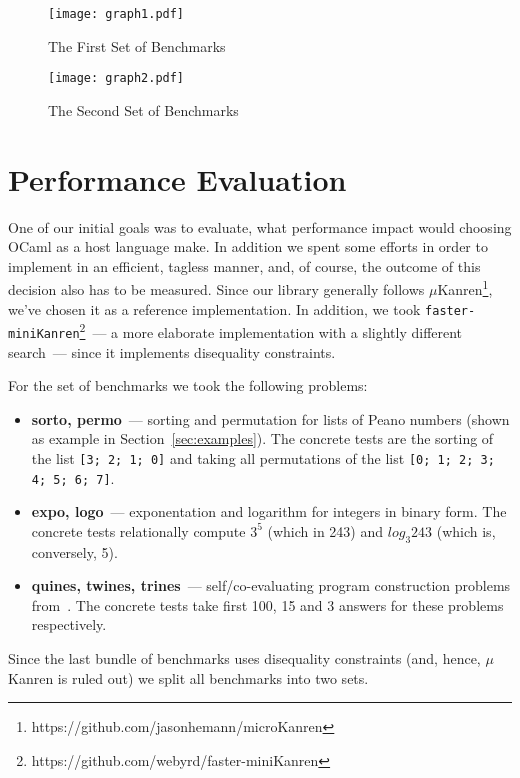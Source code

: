 \begin{figure}[t]
\centering
\texttt{[image: graph1.pdf]}
\caption{The First Set of Benchmarks}
\label{eval:first}
\end{figure}
\begin{figure}[t]
\centering
\texttt{[image: graph2.pdf]}
\caption{The Second Set of Benchmarks}
\label{eval:second}
\end{figure}

\section{Performance Evaluation}
\label{sec:evaluation}

One of our initial goals was to evaluate, what performance impact would choosing
OCaml as a host language make. In addition we spent some efforts in order to implement \miniKanren in
an efficient, tagless manner, and, of course, the outcome of this decision also has to be measured.
Since our library generally follows $\mu$Kanren\footnote{https://github.com/jasonhemann/microKanren}, we've chosen it as a reference implementation.
In addition, we took \texttt{faster-miniKanren}\footnote{https://github.com/webyrd/faster-miniKanren}~--- a more elaborate
implementation with a slightly different search~--- since it implements disequality constraints.

For the set of benchmarks we took the following problems:

\begin{itemize}
\item \textbf{sorto, permo}~--- sorting and permutation for lists of Peano numbers (shown as example in Section~\ref{sec:examples}).
The concrete tests are the sorting of the list \lstinline{[3; 2; 1; 0]} and taking all permutations of the list \lstinline{[0; 1; 2; 3; 4; 5; 6; 7]}.
\item \textbf{expo, logo}~--- exponentation and logarithm for integers in binary form. The concrete tests relationally compute
$3^5$ (which in 243) and $log_3 243$ (which is, conversely, 5).
\item \textbf{quines, twines, trines}~--- self/co-evaluating program construction problems from~\cite{Untagged}. The
concrete tests take first 100, 15 and 3 answers for these problems respectively.
\end{itemize}

Since the last bundle of benchmarks uses disequality constraints (and, hence, $\mu$Kanren is ruled out) we
split all benchmarks into two sets.


